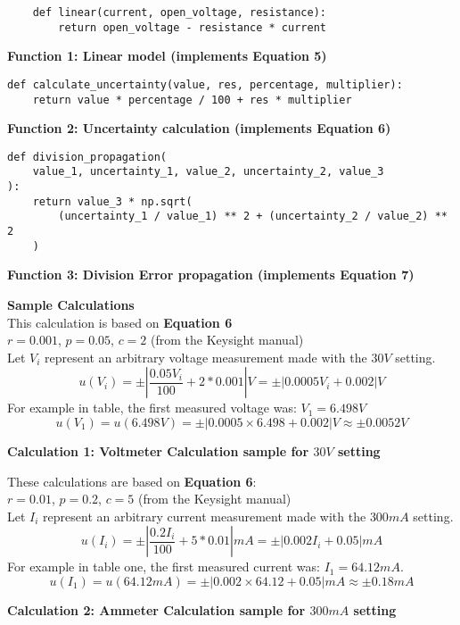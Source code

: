 \documentclass[
	letterpaper, %
	10pt, %
]{CSUniSchoolLabReport}
\begin{document}
\begin{verbatim}
    def linear(current, open_voltage, resistance):
        return open_voltage - resistance * current
    \end{verbatim}
\begin{center}
    \textbf{Function 1: Linear model (implements Equation 5)}
\end{center}

\begin{verbatim}
def calculate_uncertainty(value, res, percentage, multiplier):
    return value * percentage / 100 + res * multiplier
\end{verbatim}
\begin{center}
    \textbf{Function 2: Uncertainty calculation (implements Equation 6)}
\end{center}

\begin{verbatim}
def division_propagation(
    value_1, uncertainty_1, value_2, uncertainty_2, value_3
):
    return value_3 * np.sqrt(
        (uncertainty_1 / value_1) ** 2 + (uncertainty_2 / value_2) ** 2
    )
\end{verbatim}
\begin{center}
    \textbf{Function 3: Division Error propagation (implements Equation 7)}
\end{center}

{\large\textbf{Sample Calculations}}\\

This calculation is based on \textbf{Equation 6}\\
$r = 0.001$, $p = 0.05$, $c=2$ (from the Keysight manual)\\
Let $V_i$ represent an arbitrary voltage measurement made with the $30V$ setting.\\
$$u(V_i) = \pm \left|\frac{0.05V_i }{100} +  2* 0.001\right|V = \pm\left|0.0005V_i + 0.002\right|V$$
For example in table, the first measured voltage was: $V_1=6.498V$\\
$$u(V_1) = u(6.498V) = \pm \left|0.0005 \times 6.498 + 0.002\right|V \approx \pm 0.0052V$$
\begin{center}
    \textbf{Calculation 1: Voltmeter Calculation sample for $30V$ setting}\\

\end{center}

\vspace{10pt}
These calculations are based on \textbf{Equation 6}:\\
$r = 0.01$, $p = 0.2$, $c=5$ (from the Keysight manual)\\
Let $I_i$ represent an arbitrary current measurement made with the $300mA$ setting.\\
$$u(I_i) = \pm \left|\frac{0.2I_i }{100} +  5* 0.01\right|mA = \pm\left|0.002I_i + 0.05\right|mA$$
For example in table one, the first measured current was: $I_1 = 64.12mA$.
$$u(I_1)= u(64.12mA) = \pm\left|0.002 \times 64.12 + 0.05\right|mA \approx \pm 0.18mA$$
\begin{center}
    \textbf{Calculation 2: Ammeter Calculation sample for $300mA$ setting}
\end{center}


\end{document}
